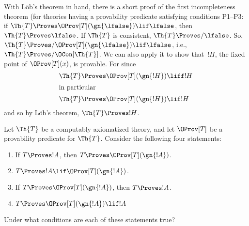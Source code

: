 \documentclass[../../../include/open-logic-section]{subfiles}
\begin{document}
With L\"ob's theorem in hand, there is a short proof of the first
incompleteness theorem (for theories having a provability predicate
satisfying conditions P1--P3: if $\Th{T} \Proves
\OProv[T](\gn{\lfalse}) \lif \lfalse$, then $\Th{T} \Proves \lfalse$.
If $\Th{T}$ is consistent, $\Th{T} \Proves/ \lfalse$. So, $\Th{T}
\Proves/ \OProv[T](\gn{\lfalse}) \lif \lfalse$, i.e., $\Th{T} \Proves/
\OCon[\Th{T}]$.  We can also apply it to show that~$!H$, the fixed
point of $\OProv[T](x)$, is provable. For since
\begin{align*}
  \Th{T} & \Proves \OProv[T](\gn{!H}) \liff !H\\
  \intertext{in particular}
    \Th{T} & \Proves \OProv[T](\gn{!H}) \lif !H
\end{align*}
and so by L\"ob's theorem, $\Th{T} \Proves !H$.


\begin{prob}
Let $\Th{T}$ be a computably axiomatized theory, and
let $\OProv[T]$ be a provability predicate for $\Th{T}$. Consider the
following four statements:
\begin{enumerate}
\item If $T \Proves !A$, then $T \Proves \OProv[T](\gn{!A})$.
\item $T \Proves !A \lif \OProv[T](\gn{!A})$.
\item If $T \Proves \OProv[T](\gn{!A})$, then $T \Proves !A$.
\item $T \Proves \OProv[T](\gn{!A}) \lif !A$
\end{enumerate}
Under what conditions are each of these statements true?
\end{prob}
\end{document}
